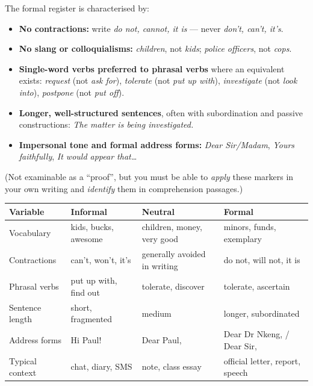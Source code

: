 \documentclass[11pt]{article}
\begin{document}
\begin{propriete}
The formal register is characterised by:
\begin{itemize}
\item \textbf{No contractions:} write \emph{do not, cannot, it is} — never \emph{don't, can't, it's}.
\item \textbf{No slang or colloquialisms:} \emph{children}, not \emph{kids}; \emph{police officers}, not \emph{cops}.
\item \textbf{Single-word verbs preferred to phrasal verbs} where an equivalent exists: \emph{request} (not \emph{ask for}), \emph{tolerate} (not \emph{put up with}), \emph{investigate} (not \emph{look into}), \emph{postpone} (not \emph{put off}).
\item \textbf{Longer, well-structured sentences}, often with subordination and passive constructions: \emph{The matter is being investigated.}
\item \textbf{Impersonal tone and formal address forms:} \emph{Dear Sir/Madam}, \emph{Yours faithfully}, \emph{It would appear that\ldots}
\end{itemize}
(Not examinable as a ``proof'', but you must be able to \emph{apply} these markers in your own writing and \emph{identify} them in comprehension passages.)
\end{propriete}

\begin{center}
\begin{tabularx}{\linewidth}{|l|X|X|X|}
\hline
\rowcolor{popblueL} \textbf{Variable} & \textbf{Informal} & \textbf{Neutral} & \textbf{Formal} \\
\hline
Vocabulary & kids, bucks, awesome & children, money, very good & minors, funds, exemplary \\
\hline
Contractions & can't, won't, it's & generally avoided in writing & do not, will not, it is \\
\hline
Phrasal verbs & put up with, find out & tolerate, discover & tolerate, ascertain \\
\hline
Sentence length & short, fragmented & medium & longer, subordinated \\
\hline
Address forms & Hi Paul! & Dear Paul, & Dear Dr Nkeng, / Dear Sir, \\
\hline
Typical context & chat, diary, SMS & note, class essay & official letter, report, speech \\
\hline
\end{tabularx}
\end{center}
\end{document}
